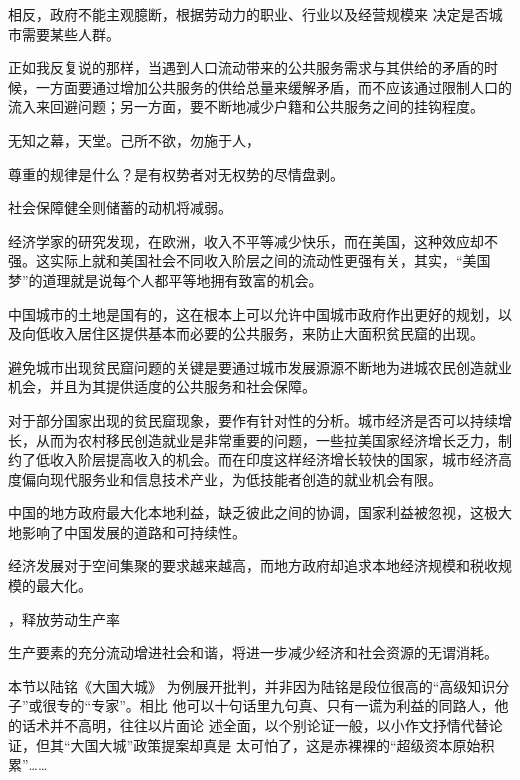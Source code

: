 相反，政府不能主观臆断，根据劳动力的职业、行业以及经营规模来 决定是否城市需要某些人群。


正如我反复说的那样，当遇到人口流动带来的公共服务需求与其供给的矛盾的时候，一方面要通过增加公共服务的供给总量来缓解矛盾，而不应该通过限制人口的流入来回避问题；另一方面，要不断地减少户籍和公共服务之间的挂钩程度。

无知之幕，天堂。己所不欲，勿施于人，


尊重的规律是什么？是有权势者对无权势的尽情盘剥。


社会保障健全则储蓄的动机将减弱。

经济学家的研究发现，在欧洲，收入不平等减少快乐，而在美国，这种效应却不强。这实际上就和美国社会不同收入阶层之间的流动性更强有关，其实，“美国梦”的道理就是说每个人都平等地拥有致富的机会。

中国城市的土地是国有的，这在根本上可以允许中国城市政府作出更好的规划，以及向低收入居住区提供基本而必要的公共服务，来防止大面积贫民窟的出现。

避免城市出现贫民窟问题的关键是要通过城市发展源源不断地为进城农民创造就业机会，并且为其提供适度的公共服务和社会保障。

对于部分国家出现的贫民窟现象，要作有针对性的分析。城市经济是否可以持续增长，从而为农村移民创造就业是非常重要的问题，一些拉美国家经济增长乏力，制约了低收入阶层提高收入的机会。而在印度这样经济增长较快的国家，城市经济高度偏向现代服务业和信息技术产业，为低技能者创造的就业机会有限。

中国的地方政府最大化本地利益，缺乏彼此之间的协调，国家利益被忽视，这极大地影响了中国发展的道路和可持续性。

经济发展对于空间集聚的要求越来越高，而地方政府却追求本地经济规模和税收规模的最大化。

，释放劳动生产率

生产要素的充分流动增进社会和谐，将进一步减少经济和社会资源的无谓消耗。

本节以陆铭《大国大城》
为例展开批判，并非因为陆铭是段位很高的“高级知识分子”或很专的“专家”。相比
他可以十句话里九句真、只有一谎为利益的同路人，他的话术并不高明，往往以片面论
述全面，以个别论证一般，以小作文抒情代替论证，但其“大国大城”政策提案却真是
太可怕了，这是赤裸裸的“超级资本原始积累”……



